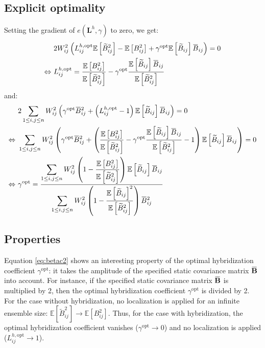 \documentclass[12pt]{scrartcl}
\newcommand{\overbar}[1]{\mkern 1.5mu\overline{\mkern-1.5mu#1\mkern-1.5mu}\mkern 1.5mu}
\begin{document}
\subsection{Explicit optimality}
Setting the gradient of $e(\mathbf{L}^h,\gamma)$ to zero, we get:
\begin{align}
\label{eq:hyb_th}
& 2 W_{ij}^2 \left(L^{h,\mathrm{opt}}_{ij} \mathbb{E} \left[\widetilde{B}_{ij}^2\right] - \mathbb{E} \left[B^2_{ij}\right] + \gamma^\mathrm{opt} \mathbb{E} \left[\widetilde{B}_{ij}\right] \overbar{B}_{ij} \right) = 0 \nonumber \\
\Leftrightarrow \ & L^{h,\mathrm{opt}}_{ij} = \frac{\mathbb{E} \left[B^2_{ij}\right]}{\mathbb{E} \left[\widetilde{B}_{ij}^2\right]} - \gamma^\mathrm{opt} \frac{\mathbb{E} \left[\widetilde{B}_{ij}\right] \overbar{B}_{ij}}{\mathbb{E} \left[\widetilde{B}_{ij}^2\right]}
\end{align}
and:
\begin{align}
\label{eq:betac2}
& 2 \sum_{1 \le i,j \le n} W_{ij}^2 \left(\gamma^\mathrm{opt} \overbar{B}_{ij}^2 + \left(L^{h,\mathrm{opt}}_{ij} - 1\right) \mathbb{E} \left[\widetilde{B}_{ij}\right] \overbar{B}_{ij} \right) = 0 \nonumber \\
\Leftrightarrow \ & \sum_{1 \le i,j \le n} W_{ij}^2 \left(\gamma^\mathrm{opt} \overbar{B}_{ij}^2 + \left(\frac{\mathbb{E} \left[B^2_{ij}\right]}{\mathbb{E} \left[\widetilde{B}_{ij}^2\right]} - \gamma^\mathrm{opt} \frac{\mathbb{E} \left[\widetilde{B}_{ij}\right] \overbar{B}_{ij}}{\mathbb{E} \left[\widetilde{B}_{ij}^2\right]} - 1\right) \mathbb{E} \left[\widetilde{B}_{ij}\right] \overbar{B}_{ij} \right) = 0 \nonumber \\
\Leftrightarrow \ & \gamma^\mathrm{opt} = \frac{\displaystyle \sum_{1 \le i,j \le n} W_{ij}^2 \left(1 - \frac{\mathbb{E} \left[B^2_{ij}\right]}{\mathbb{E} \left[\widetilde{B}_{ij}^2\right]}\right) \mathbb{E}\left[ \widetilde{B}_{ij}\right] \overbar{B}_{ij}}{\displaystyle \sum_{1 \le i,j \le n} W_{ij}^2 \left(1 - \frac{\mathbb{E} \left[\widetilde{B}_{ij}\right]^2}{\mathbb{E}\left[ \widetilde{B}_{ij}^2 \right]}\right) \overbar{B}_{ij}^2}
\end{align}

\subsection{Properties}
Equation \eqref{eq:betac2} shows an interesting property of the optimal hybridization coefficient $\gamma^\mathrm{opt}$: it takes the amplitude of the specified static covariance matrix $\overbar{\mathbf{B}}$ into account. For instance, if the specified static covariance matrix  $\overbar{\mathbf{B}}$ is multiplied by 2, then the optimal hybridization coefficient $\gamma^\mathrm{opt}$ is divided by 2.\\
$  $\\
For the case without hybridization, no localization is applied for an infinite ensemble size: $\mathbb{E} \left[\widetilde{B}_{ij}^2\right] \rightarrow \mathbb{E} \left[B^2_{ij}\right]$. Thus, for the case with hybridization, the optimal hybridization coefficient vanishes ($\gamma^\mathrm{opt} \rightarrow 0$) and no localization is applied ($L^{h,\mathrm{opt}}_{ij} \rightarrow 1$).
\end{document}
